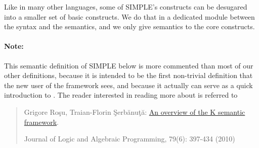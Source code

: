 \begin{latexComment}
\begin{itemize}
\end{itemize}
Like in many other languages, some of SIMPLE's constructs can be
desugared into a smaller set of basic constructs.  We do that in a 
dedicated module between the syntax and the semantics, and we only
give semantics to the core constructs.

\paragraph{Note:}{
This \K semantic definition of SIMPLE below is more commented than most
of our other \K definitions, because it is intended to be the first
non-trivial \K definition that the new user of the \K framework sees, and
because it actually can serve as a quick introduction to \K.  The reader
interested in reading more about \K is referred to
\begin{quote}
Grigore Ro\c su, Traian-Florin \c Serb\u anu\c t\u a:
\href{http://dx.doi.org/10.1016/j.jlap.2010.03.012}{An overview of the K semantic framework}.

Journal of Logic and Algebraic Programming, 79(6): 397-434 (2010)
\end{quote}
}
\end{latexComment}

\vspace*{3ex}
